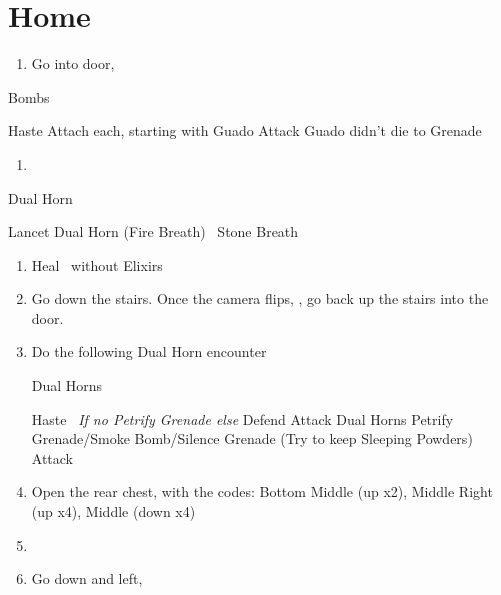 \chapter{Home}

\begin{enumerate}
  \item Go into door, \sd
\end{enumerate}
\begin{battle}{Bombs}
  \begin{itemize}
    \tidusf Haste \tidus
    \tidusf Attach each, starting with Guado
    \auronf Attack Guado didn't die to \tidus
    \rikkuf Grenade
  \end{itemize}
\end{battle}
\begin{enumerate}[resume]
  \item \sd
\end{enumerate}
\begin{battle}{Dual Horn}
  \begin{itemize}
    \kimahrif Lancet Dual Horn (Fire Breath)
    \kimahrif \od\ Stone Breath
  \end{itemize}
\end{battle}
\begin{enumerate}[resume]
  \item Heal \tidus\ without Elixirs
          \item Go down the stairs. Once the camera flips, \formation{\tidus}{\rikku}{\auron}, go back up the stairs into the door.
          \item Do the following Dual Horn encounter
                \begin{battle}{Dual Horns}
                  \begin{itemize}
                    \tidusf Haste \tidus\ \textit{If no Petrify Grenade else } Defend
                    \tidusf Attack Dual Horns
                     Petrify Grenade/Smoke Bomb/Silence Grenade (Try to keep Sleeping Powders)
                    \tidusf Attack
                  \end{itemize}
                \end{battle}
          \item Open the rear chest, with the codes: Bottom Middle (up x2), Middle Right (up x4), Middle (down x4) 
  \item \formation{\tidus}{\lulu}{\auron}
  \item Go down and left, \cs[0:50]
\end{enumerate}
